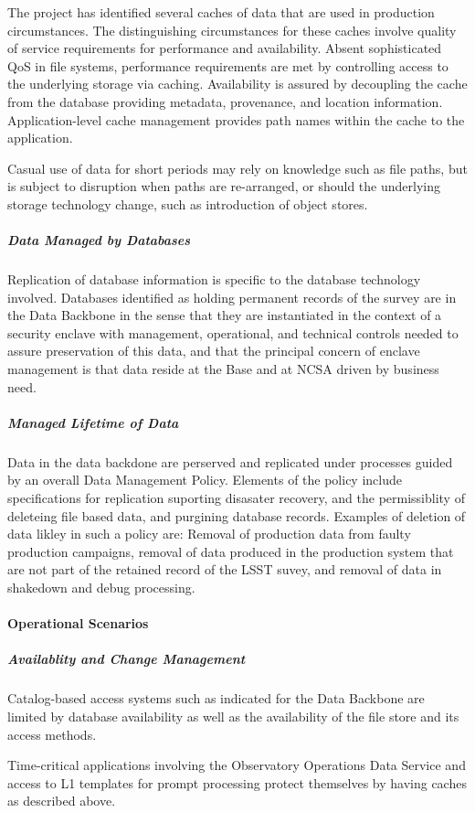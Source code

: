 The project has identified several caches of data that are used in production circumstances.
The distinguishing circumstances for these caches involve quality of service requirements for
performance and availability. Absent sophisticated QoS in file systems, performance requirements
are met by controlling access to the underlying storage via caching. Availability is assured by
decoupling the cache from the database providing metadata, provenance, and location information.
Application-level cache management provides path names within the cache to the application.

Casual use of data for short periods may rely on knowledge such as file paths, but is subject
to disruption when paths are re-arranged, or should the underlying storage technology change,
such as introduction of object stores.


\subparagraph{Data Managed by Databases}

Replication of database information is specific to the database technology involved.
Databases identified as holding permanent records of the survey are in the Data Backbone
in the sense that they are instantiated in the context of a security enclave with management,
operational, and technical controls needed to assure preservation of this data, and that the
principal concern of enclave management is that data reside at the Base and at NCSA
driven by business need.

\subparagraph{Managed Lifetime of Data}
Data in the data backdone are perserved and replicated under processes
guided by an overall Data Management Policy.  Elements of the policy
include specifications for replication suporting disasater recovery,
and the permissiblity of deleteing file based data, and purgining
database records.  Examples of deletion of data likley in such a
policy are: Removal of production data from faulty production campaigns,
removal of data produced in the production system that are not part
of the retained record of the LSST suvey, and removal of data in
shakedown and debug processing.

\paragraph{Operational Scenarios}

\subparagraph{Availablity and Change Management}

Catalog-based access systems such as indicated for the Data Backbone are
limited by database availability as well as the availability of the file
store and its access methods.

Time-critical applications involving the Observatory Operations Data
Service and access to L1 templates for prompt processing protect
themselves by having caches as described above.
